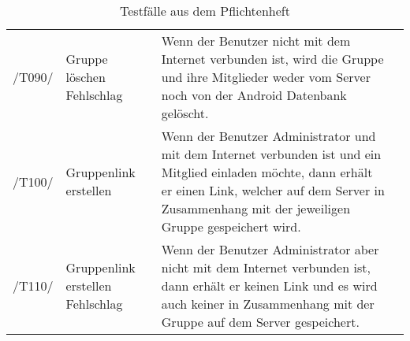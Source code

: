 \begin{table}[H]
{\begin{tabular}{|p{}||p{}|p{}|>{\centering}p{}|}
				\hspace{0pt}/T090/& Gruppe löschen Fehlschlag & Wenn der Benutzer nicht mit dem Internet verbunden ist, wird die Gruppe und ihre Mitglieder weder vom Server noch von der Android Datenbank gelöscht. & \checkmark\tabularnewline
				\hspace{0pt}/T100/& Gruppenlink erstellen & Wenn der Benutzer Administrator und mit dem Internet verbunden ist und ein Mitglied einladen möchte, dann erhält er einen Link, welcher auf dem Server in Zusammenhang mit der jeweiligen Gruppe gespeichert wird. & \checkmark\tabularnewline
				\hspace{0pt}/T110/& Gruppenlink erstellen Fehlschlag & Wenn der Benutzer Administrator aber nicht mit dem Internet verbunden ist, dann erhält er keinen Link und es wird auch keiner in Zusammenhang mit der Gruppe auf dem Server gespeichert. & \checkmark\tabularnewline
				\hline
			\end{tabular}}
			\caption{Testfälle aus dem Pflichtenheft}
		\end{table}	
